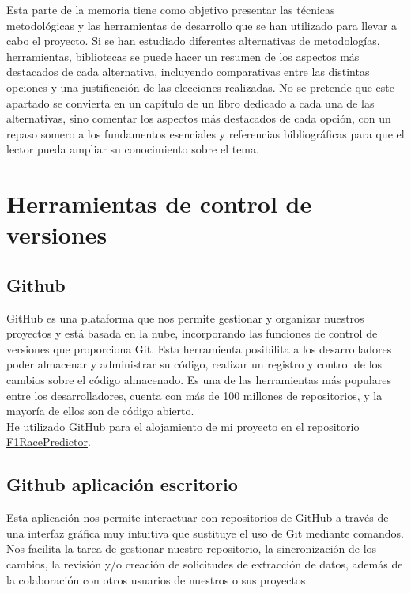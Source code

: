 
Esta parte de la memoria tiene como objetivo presentar las técnicas metodológicas y las herramientas de desarrollo que se han utilizado para llevar a cabo el proyecto. Si se han estudiado diferentes alternativas de metodologías, herramientas, bibliotecas se puede hacer un resumen de los aspectos más destacados de cada alternativa, incluyendo comparativas entre las distintas opciones y una justificación de las elecciones realizadas. 
No se pretende que este apartado se convierta en un capítulo de un libro dedicado a cada una de las alternativas, sino comentar los aspectos más destacados de cada opción, con un repaso somero a los fundamentos esenciales y referencias bibliográficas para que el lector pueda ampliar su conocimiento sobre el tema.


\section{Herramientas de control de versiones}

\subsection{Github}

GitHub es una plataforma que nos permite gestionar y organizar nuestros proyectos y está basada en la nube, incorporando las funciones de control de versiones que proporciona Git. Esta herramienta posibilita a los desarrolladores poder almacenar y administrar su código, realizar un registro y control de los cambios sobre el código almacenado. Es una de las herramientas más populares entre los desarrolladores, cuenta con más de 100 millones de repositorios, y la mayoría de ellos son de código abierto.\\
He utilizado GitHub para el alojamiento de mi proyecto en el repositorio \href{https://https://github.com/fmv1001/f1racepredictor}{F1RacePredictor}.

\subsection{Github aplicación escritorio}
Esta aplicación nos permite interactuar con repositorios de GitHub a través de una interfaz gráfica muy intuitiva que sustituye el uso de Git mediante comandos. Nos facilita la tarea de gestionar nuestro repositorio, la sincronización de los cambios, la revisión y/o creación de solicitudes de extracción de datos, además de la colaboración con otros usuarios de nuestros o sus proyectos. 


